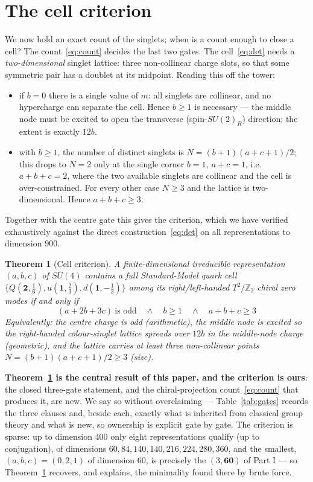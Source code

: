 \documentclass[11pt,a4paper]{article}
\newtheorem{theorem}{Theorem}
\begin{document}
\section{The cell criterion}\label{sec:theorem}
We now hold an exact count of the singlets; when is a count enough to close a cell? The
count~\eqref{eq:count} decides the last two gates. The cell~\eqref{eq:det} needs a
\emph{two-dimensional} singlet lattice: three non-collinear charge slots, so that some
symmetric pair has a doublet at its midpoint. Reading this off the tower:
\begin{itemize}
\item if $b=0$ there is a single value of $m$: all singlets are collinear, and no
hypercharge can separate the cell. Hence $b\ge1$ is necessary --- the middle node must be
excited to open the transverse (spin-$SU(2)_R$) direction; the extent is exactly $12b$.
\item with $b\ge1$, the number of distinct singlets is $N=(b+1)(a+c+1)/2$; this drops to
$N=2$ only at the single corner $b=1,\ a+c=1$, i.e.\ $a+b+c=2$, where the two available
singlets are collinear and the cell is over-constrained. For every other case $N\ge3$ and
the lattice is two-dimensional. Hence $a+b+c\ge3$.
\end{itemize}
Together with the centre gate this gives the criterion, which we have verified exhaustively
against the direct construction~\eqref{eq:det} on all representations to dimension $900$.

\begin{theorem}[Cell criterion]\label{thm:cell}
A finite-dimensional irreducible representation $(a,b,c)$ of $SU(4)$ contains a full
Standard-Model quark cell $\{Q(\mathbf 2,\tfrac16),u(\mathbf 1,\tfrac23),d(\mathbf 1,-\tfrac13)\}$
among its right/left-handed $T^2/\mathbb{Z}_2$ chiral zero modes if and only if
\[
\boxed{\;(a+2b+3c)\ \text{is odd}\quad\wedge\quad b\ge1\quad\wedge\quad a+b+c\ge3\;}
\]
Equivalently: the centre charge is odd (arithmetic), the middle node is excited so the
right-handed colour-singlet lattice spreads over $12b$ in the middle-node charge
(geometric), and the lattice carries at least three non-collinear points
$N=(b+1)(a+c+1)/2\ge3$ (size).
\end{theorem}

\textbf{Theorem~\ref{thm:cell} is the central result of this paper, and the criterion is
ours}: the closed three-gate statement, and the chiral-projection count~\eqref{eq:count}
that produces it, are new. We say so without overclaiming --- Table~\ref{tab:gates} records
the three clauses and, beside each, exactly what is inherited from classical group theory
and what is new, so ownership is explicit gate by gate. The criterion is sparse: up to
dimension $400$ only eight representations
qualify (up to conjugation), of dimensions
$60,84,140,140,216,224,280,360$, and the smallest, $(a,b,c)=(0,2,1)$ of dimension $60$, is
precisely the $(3,\mathbf{60})$ of Part I --- so Theorem~\ref{thm:cell} recovers, and
explains, the minimality found there by brute force.
\end{document}
